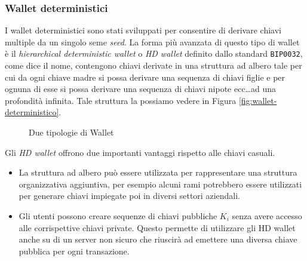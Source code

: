\subsubsection{Wallet deterministici}
I wallet deterministici sono stati sviluppati per consentire di derivare chiavi multiple da un singolo seme \textit{seed}. La forma più avanzata di questo tipo di wallet è il \textit{hierarchical deterministic wallet} o \textit{HD wallet} definito dallo standard \texttt{BIP0032}, come dice il nome, contengono chiavi derivate in una struttura ad albero tale per cui da ogni chiave madre si possa derivare una sequenza di chiavi figlie e per ognuna di esse si possa derivare una sequenza di chiavi nipote ecc\dots ad una profondità infinita. Tale struttura la possiamo vedere in Figura \ref{fig:wallet-deterministico}.
\begin{figure}
	\centering
	 \quad
	\caption{Due tipologie di Wallet}
	\label{fig:tipologie-di-wallet}
\end{figure}
Gli \textit{HD wallet} offrono due importanti vantaggi rispetto alle chiavi casuali.
\begin{itemize}
	\item La struttura ad albero può essere utilizzata per rappresentare una struttura organizzativa aggiuntiva, per esempio alcuni rami potrebbero essere utilizzati per generare chiavi impiegate poi in diversi settori aziendali.
	\item Gli utenti possono creare sequenze di chiavi pubbliche $K_{i}$ senza avere accesso alle corrispettive chiavi private. Questo permette di utilizzare gli HD wallet anche su di un server non sicuro che riuscirà ad emettere una diversa chiave pubblica per ogni transazione.
\end{itemize}

